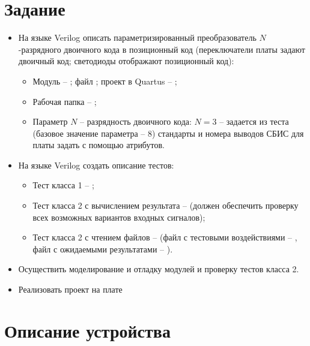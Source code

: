 





\tableofcontents
\newpage

\section{Задание}

\begin{itemize}
	\item На языке Verilog описать параметризированный преобразователь $N$-разрядного двоичного кода в позиционный код (переключатели платы  задают двоичный код; светодиоды отображают позиционный код):
		\begin{itemize}
			\item Модуль -- ; файл ; проект в Quartus -- ; \item Рабочая папка -- ;
			\item Параметр $N$ -- разрядность двоичного кода: $N=3$ -- задается из теста (базовое значение параметра -- $8$) стандарты и номера выводов СБИС для платы  задать с помощью атрибутов.
		\end{itemize}
	
	\item На языке Verilog создать описание тестов:
		\begin{itemize}
			\item Тест класса 1 -- ;
			\item Тест класса 2 с вычислением результата --  (должен обеспечить проверку всех возможных вариантов входных сигналов);
			\item Тест класса 2 с чтением файлов --  (файл с тестовыми воздействиями -- , файл с ожидаемыми результатами -- ).
		\end{itemize}
	\item Осуществить моделирование и отладку модулей и проверку тестов класса 2.
	\item Реализовать проект на плате 
\end{itemize}

\section{Описание устройства}

